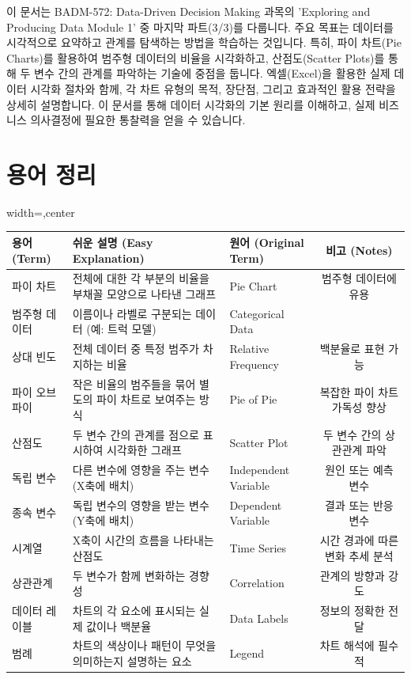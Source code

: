 \documentclass[11pt,a4paper]{article}
\begin{document}
이 문서는 BADM-572: Data-Driven Decision Making 과목의 'Exploring and Producing Data Module 1' 중 마지막 파트(3/3)를 다룹니다.
주요 목표는 데이터를 시각적으로 요약하고 관계를 탐색하는 방법을 학습하는 것입니다.
특히, 파이 차트(Pie Charts)를 활용하여 범주형 데이터의 비율을 시각화하고,
산점도(Scatter Plots)를 통해 두 변수 간의 관계를 파악하는 기술에 중점을 둡니다.
엑셀(Excel)을 활용한 실제 데이터 시각화 절차와 함께,
각 차트 유형의 목적, 장단점, 그리고 효과적인 활용 전략을 상세히 설명합니다.
이 문서를 통해 데이터 시각화의 기본 원리를 이해하고, 실제 비즈니스 의사결정에 필요한 통찰력을 얻을 수 있습니다.

\newpage
\section{용어 정리}

\begin{adjustbox}{width=\textwidth,center}
\begin{tabular}{lllc}
\toprule
\textbf{용어 (Term)} & \textbf{쉬운 설명 (Easy Explanation)} & \textbf{원어 (Original Term)} & \textbf{비고 (Notes)} \\
\midrule
파이 차트 & 전체에 대한 각 부분의 비율을 부채꼴 모양으로 나타낸 그래프 & Pie Chart & 범주형 데이터에 유용 \\
범주형 데이터 & 이름이나 라벨로 구분되는 데이터 (예: 트럭 모델) & Categorical Data & \\
상대 빈도 & 전체 데이터 중 특정 범주가 차지하는 비율 & Relative Frequency & 백분율로 표현 가능 \\
파이 오브 파이 & 작은 비율의 범주들을 묶어 별도의 파이 차트로 보여주는 방식 & Pie of Pie & 복잡한 파이 차트 가독성 향상 \\
산점도 & 두 변수 간의 관계를 점으로 표시하여 시각화한 그래프 & Scatter Plot & 두 변수 간의 상관관계 파악 \\
독립 변수 & 다른 변수에 영향을 주는 변수 (X축에 배치) & Independent Variable & 원인 또는 예측 변수 \\
종속 변수 & 독립 변수의 영향을 받는 변수 (Y축에 배치) & Dependent Variable & 결과 또는 반응 변수 \\
시계열 & X축이 시간의 흐름을 나타내는 산점도 & Time Series & 시간 경과에 따른 변화 추세 분석 \\
상관관계 & 두 변수가 함께 변화하는 경향성 & Correlation & 관계의 방향과 강도 \\
데이터 레이블 & 차트의 각 요소에 표시되는 실제 값이나 백분율 & Data Labels & 정보의 정확한 전달 \\
범례 & 차트의 색상이나 패턴이 무엇을 의미하는지 설명하는 요소 & Legend & 차트 해석에 필수적 \\
\bottomrule
\end{tabular}
\end{adjustbox}
\end{document}
